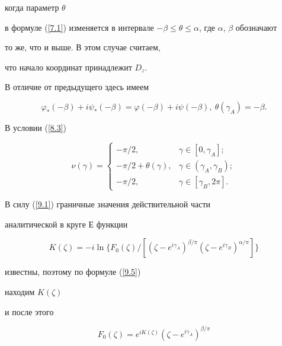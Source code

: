 {когда параметр $\theta$


в формуле (\ref{7.1}) изменяется в интервале $-\beta\leq\theta\leq


\alpha$, где $\alpha$, $\beta$ обозначают


то же, что и выше. В этом случае считаем,


что начало координат принадлежит $D_z$.





В отличие от предыдущего здесь имеем


$$


\varphi_{*}(-\beta)+i\psi_{*}(-\beta)=\varphi(-\beta)+i\psi(-\beta) ,\ 


\theta(\gamma_{A})=-\beta.


$$


В условии (\ref{8.3})


$$




\nu(\gamma)=\begin{cases}


-\pi/2, & \gamma\in[0,\gamma_{A}];\\


-\pi/2 +\theta(\gamma), & \gamma\in (\gamma_{A},\gamma_{B});\\


-\pi/2, & \gamma\in [\gamma_{B},2\pi].


\end{cases}




$$


В силу (\ref{9.1}) граничные значения действительной части


аналитической в круге $Е$ функции


$$


K(\zeta)=-i\ln\{F_{0}(\zeta)/[(\zeta-e^{i\gamma_{A}})^{\beta/\pi}


(\zeta-e^{i\gamma_{B}})^{\alpha/\pi}]\}


$$


известны, поэтому по формуле (\ref{9.5})


находим $K(\zeta)$


и после этого


\begin{equation}\label{13.6}


F_{0}(\zeta)=e^{iK(\zeta)}(\zeta-e^{i\gamma_{A}})^{\beta/\pi}



\end{equation}}
